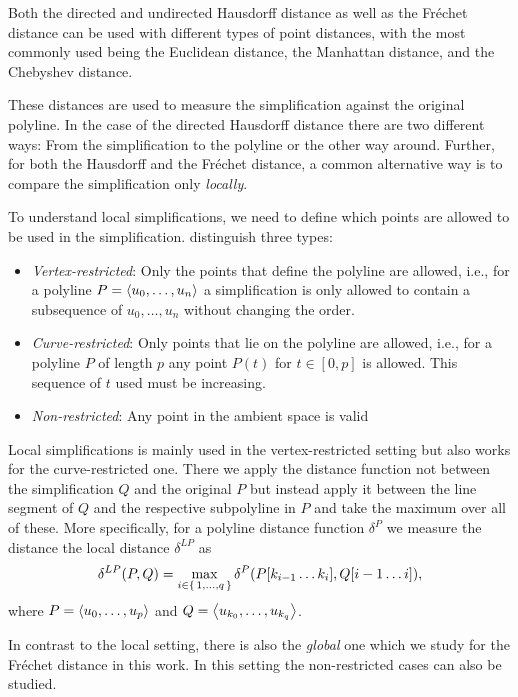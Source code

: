 Both the directed and undirected Hausdorff distance as well as the Fréchet distance can be used with different types of point distances, with the most commonly used being the Euclidean distance, the Manhattan distance, and the Chebyshev distance.

These distances are used to measure the simplification against the original polyline. In the case of the directed Hausdorff distance there are two different ways: From the simplification to the polyline or the other way around. 
Further, for both the Hausdorff and the Fréchet distance, a common alternative way is to compare the simplification only \emph{locally}.

To understand local simplifications, we need to define which points are allowed to be used in the simplification. \citeauthor{global_curve_simplification} distinguish three types:
\begin{itemize}
  \item \emph{Vertex-restricted}: Only the points that define the polyline are allowed, i.e., for a polyline \(P = \left\langle u_0, \dots, u_n\right\rangle\) a simplification is only allowed to contain a subsequence of \(u_0, \dots, u_n\) without changing the order.
	\item \emph{Curve-restricted}: Only points that lie on the polyline are allowed, i.e., for a polyline \(P\) of length \(p\) any point \(P(t)\) for \(t \in [0, p]\) is allowed. This sequence of \(t\) used must be increasing.
	\item \emph{Non-restricted}: Any point in the ambient space is valid 
\end{itemize}

Local simplifications is mainly used in the vertex-restricted setting but also works for the curve-restricted one. There we apply the distance function not between the simplification \(Q\) and the original \(P\) but instead apply it between the line segment of \(Q\) and the respective subpolyline in \(P\) and take the maximum over all of these. More specifically, for a polyline distance function \(\delta^P\) we measure the distance the local distance \(\delta^{LP}\) as 
\[\delta^{LP}(P, Q) = \max_{i \in \set{1,\dots, q}} \delta^P(P[k_{i-1}\dots k_i], Q[i-1 \dots i]),\]
where \(P = \left\langle u_0, \dots, u_p\right\rangle\) and \(Q = \left\langle u_{k_0}, \dots, u_{k_q}\right\rangle\).

In contrast to the local setting, there is also the \emph{global} one which we study for the Fréchet distance in this work. In this setting the non-restricted cases can also be studied.

